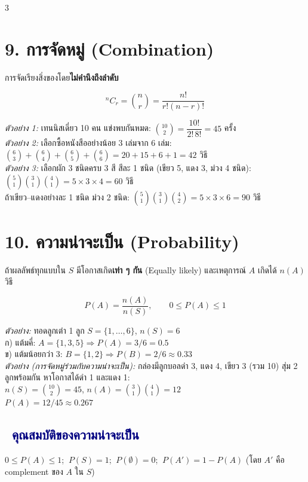 \documentclass[9pt]{extarticle}
\newcommand{\dist}[1]{\subsection*{\textcolor{navy}{\textbullet\ #1}}}
\begin{document}
\begin{multicols}{3}
\section*{9. การจัดหมู่ (Combination)}
การจัดเรียงสิ่งของโดย\textbf{ไม่คำนึงถึงลำดับ}
\begin{formulabox}
$$\displaystyle{}^nC_r=\binom{n}{r}=\frac{n!}{r!(n-r)!}$$
\end{formulabox}
\begin{solbox}
\textit{ตัวอย่าง 1:} เทนนิสเดี่ยว 10 คน แข่งพบกันหมด: $\binom{10}{2}=\dfrac{10!}{2!\,8!}=45$ ครั้ง\\[3pt]
\textit{ตัวอย่าง 2:} เลือกซื้อหนังสืออย่างน้อย 3 เล่มจาก 6 เล่ม:\\
$\binom{6}{3}{+}\binom{6}{4}{+}\binom{6}{5}{+}\binom{6}{6}=20{+}15{+}6{+}1=42$ วิธี\\[3pt]
\textit{ตัวอย่าง 3:} เลือกผัก 3 ชนิดครบ 3 สี สีละ 1 ชนิด (เขียว 5, แดง 3, ม่วง 4 ชนิด):\\
$\binom{5}{1}\binom{3}{1}\binom{4}{1}=5{\times}3{\times}4=60$ วิธี\\
ถ้าเขียว--แดงอย่างละ 1 ชนิด ม่วง 2 ชนิด: $\binom{5}{1}\binom{3}{1}\binom{4}{2}=5{\times}3{\times}6=90$ วิธี
\end{solbox}

\section*{10. ความน่าจะเป็น (Probability)}
ถ้าผลลัพธ์ทุกแบบใน $S$ มีโอกาสเกิด\textbf{เท่า ๆ กัน} (Equally likely) และเหตุการณ์ $A$ เกิดได้ $n(A)$ วิธี
\begin{formulabox}
$$P(A)=\frac{n(A)}{n(S)},\qquad 0\le P(A)\le1$$
\end{formulabox}
\begin{solbox}
\textit{ตัวอย่าง:} ทอดลูกเต๋า 1 ลูก $S=\{1,\dots,6\}$, $n(S)=6$\\
ก) แต้มคี่: $A=\{1,3,5\}\Rightarrow P(A)=3/6=0.5$\\
ข) แต้มน้อยกว่า 3: $B=\{1,2\}\Rightarrow P(B)=2/6\approx0.33$\\[3pt]
\textit{ตัวอย่าง (การจัดหมู่ร่วมกับความน่าจะเป็น):} กล่องมีลูกบอลดำ 3, แดง 4, เขียว 3 (รวม 10) สุ่ม 2 ลูกพร้อมกัน หาโอกาสได้ดำ 1 และแดง 1:\\
$n(S)=\binom{10}{2}=45$, $n(A)=\binom31\binom41=12$\\
$P(A)=12/45\approx0.267$
\end{solbox}

\dist{คุณสมบัติของความน่าจะเป็น}
$0\le P(A)\le1$; $\ P(S)=1$; $\ P(\emptyset)=0$; $\ P(A')=1-P(A)$ (โดย $A'$ คือ complement ของ $A$ ใน $S$)


\end{multicols}
\end{document}
